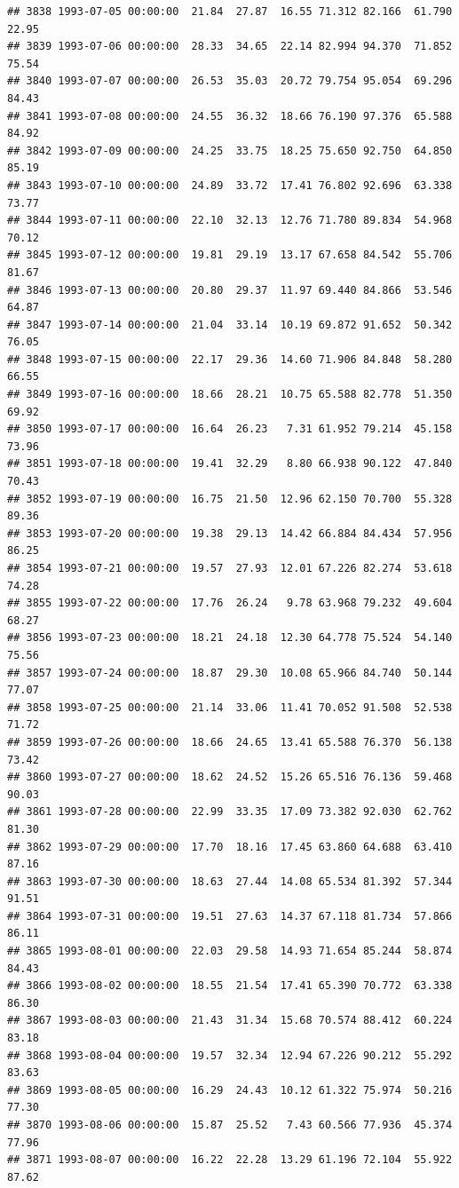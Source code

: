 \documentclass{article}\usepackage{graphicx, color}
\makeatletter
\newenvironment{kframe}{%
 \def\at@end@of@kframe{}%
 \ifinner\ifhmode%
  \def\at@end@of@kframe{\end{minipage}}%
  \begin{minipage}{\columnwidth}%
 \fi\fi%
 \def\FrameCommand##1{\hskip\@totalleftmargin \hskip-\fboxsep
 \colorbox{shadecolor}{##1}\hskip-\fboxsep
     \hskip-\linewidth \hskip-\@totalleftmargin \hskip\columnwidth}%
 \MakeFramed {\advance\hsize-\width
   \@totalleftmargin\z@ \linewidth\hsize
   \@setminipage}}%
 {\par\unskip\endMakeFramed%
 \at@end@of@kframe}
\newenvironment{knitrout}{}{} %
\makeatother
\begin{document}
\begin{knitrout}
\begin{kframe}
\begin{verbatim}
## 3838 1993-07-05 00:00:00  21.84  27.87  16.55 71.312 82.166  61.790  22.95
## 3839 1993-07-06 00:00:00  28.33  34.65  22.14 82.994 94.370  71.852  75.54
## 3840 1993-07-07 00:00:00  26.53  35.03  20.72 79.754 95.054  69.296  84.43
## 3841 1993-07-08 00:00:00  24.55  36.32  18.66 76.190 97.376  65.588  84.92
## 3842 1993-07-09 00:00:00  24.25  33.75  18.25 75.650 92.750  64.850  85.19
## 3843 1993-07-10 00:00:00  24.89  33.72  17.41 76.802 92.696  63.338  73.77
## 3844 1993-07-11 00:00:00  22.10  32.13  12.76 71.780 89.834  54.968  70.12
## 3845 1993-07-12 00:00:00  19.81  29.19  13.17 67.658 84.542  55.706  81.67
## 3846 1993-07-13 00:00:00  20.80  29.37  11.97 69.440 84.866  53.546  64.87
## 3847 1993-07-14 00:00:00  21.04  33.14  10.19 69.872 91.652  50.342  76.05
## 3848 1993-07-15 00:00:00  22.17  29.36  14.60 71.906 84.848  58.280  66.55
## 3849 1993-07-16 00:00:00  18.66  28.21  10.75 65.588 82.778  51.350  69.92
## 3850 1993-07-17 00:00:00  16.64  26.23   7.31 61.952 79.214  45.158  73.96
## 3851 1993-07-18 00:00:00  19.41  32.29   8.80 66.938 90.122  47.840  70.43
## 3852 1993-07-19 00:00:00  16.75  21.50  12.96 62.150 70.700  55.328  89.36
## 3853 1993-07-20 00:00:00  19.38  29.13  14.42 66.884 84.434  57.956  86.25
## 3854 1993-07-21 00:00:00  19.57  27.93  12.01 67.226 82.274  53.618  74.28
## 3855 1993-07-22 00:00:00  17.76  26.24   9.78 63.968 79.232  49.604  68.27
## 3856 1993-07-23 00:00:00  18.21  24.18  12.30 64.778 75.524  54.140  75.56
## 3857 1993-07-24 00:00:00  18.87  29.30  10.08 65.966 84.740  50.144  77.07
## 3858 1993-07-25 00:00:00  21.14  33.06  11.41 70.052 91.508  52.538  71.72
## 3859 1993-07-26 00:00:00  18.66  24.65  13.41 65.588 76.370  56.138  73.42
## 3860 1993-07-27 00:00:00  18.62  24.52  15.26 65.516 76.136  59.468  90.03
## 3861 1993-07-28 00:00:00  22.99  33.35  17.09 73.382 92.030  62.762  81.30
## 3862 1993-07-29 00:00:00  17.70  18.16  17.45 63.860 64.688  63.410  87.16
## 3863 1993-07-30 00:00:00  18.63  27.44  14.08 65.534 81.392  57.344  91.51
## 3864 1993-07-31 00:00:00  19.51  27.63  14.37 67.118 81.734  57.866  86.11
## 3865 1993-08-01 00:00:00  22.03  29.58  14.93 71.654 85.244  58.874  84.43
## 3866 1993-08-02 00:00:00  18.55  21.54  17.41 65.390 70.772  63.338  86.30
## 3867 1993-08-03 00:00:00  21.43  31.34  15.68 70.574 88.412  60.224  83.18
## 3868 1993-08-04 00:00:00  19.57  32.34  12.94 67.226 90.212  55.292  83.63
## 3869 1993-08-05 00:00:00  16.29  24.43  10.12 61.322 75.974  50.216  77.30
## 3870 1993-08-06 00:00:00  15.87  25.52   7.43 60.566 77.936  45.374  77.96
## 3871 1993-08-07 00:00:00  16.22  22.28  13.29 61.196 72.104  55.922  87.62

\end{verbatim}
\end{kframe}
\end{knitrout}
\end{document}
